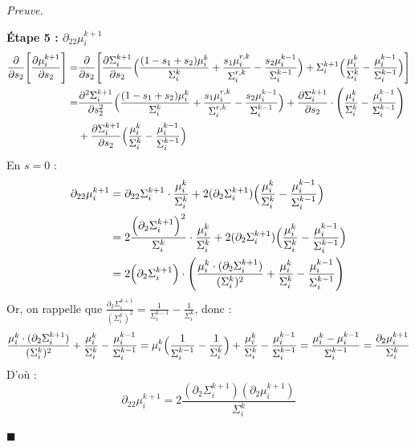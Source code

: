 \documentclass[12pt]{article}
\renewcommand{\qedsymbol}{$\blacksquare$}
\renewenvironment{proof}[1][\proofname]{%
  \par\medskip\noindent
  \textit{\color{proofgray}#1.}\enspace\ignorespaces
}{\hfill\qedsymbol\par\medskip}
\renewcommand{\proofname}{Preuve}
\begin{document}
\begin{proof}
\medskip
\textbf{Étape 5 : $\partial_{22}\mu_i^{k+1}$}
\begin{equation*}
\begin{aligned}
\frac{\partial}{\partial s_2}\Biggl[
    \frac{\partial \mu_i^{k+1}}{\partial s_2}
\Biggr] 
=& \frac{\partial}{\partial s_2}\Biggl[ 
\frac{\partial \Sigma_i^{k+1}}{\partial s_2} \Bigl( 
    \frac{(1-s_1+s_2)\mu_i^k}{\Sigma_i^{k}} + \frac{s_1\mu_i^{r,k}}{\Sigma_i^{r,k}} - \frac{s_2\mu_i^{k-1}}{\Sigma_i^{k-1}} \Bigr) 
    + \Sigma_i^{k+1} \Bigl( 
        \frac{\mu_i^{k}}{\Sigma_i^{k}} - \frac{\mu_i^{k-1}}{\Sigma_i^{k-1}}
    \Bigr)
\Biggr]\\
=& \frac{\partial^2 \Sigma_i^{k+1}}{\partial s_2^2 }  \Bigl( 
    \frac{(1-s_1+s_2)\mu_i^k}{\Sigma_i^{k}} + \frac{s_1\mu_i^{r,k}}{\Sigma_i^{r,k}} - \frac{s_2\mu_i^{k-1}}{\Sigma_i^{k-1}} \Bigr) 
    + \frac{\partial \Sigma_i^{k+1}}{\partial s_2} \cdot \Biggl(
        \frac{\mu_i^{k}}{\Sigma_i^{k}} - \frac{\mu_i^{k-1}}{\Sigma_i^{k-1}}
    \Biggr)\\
    &+ \frac{\partial \Sigma_i^{k+1}}{\partial s_2}  \Bigl( 
        \frac{\mu_i^{k}}{\Sigma_i^{k}} - \frac{\mu_i^{k-1}}{\Sigma_i^{k-1}}
    \Bigr)
\end{aligned}
\end{equation*}
En $s=0$ :
\begin{equation*}
    \begin{aligned}
\partial_{22} \mu_i^{k+1} &= \partial_{22} \Sigma_i^{k+1} \cdot \frac{\mu_i^k}{\Sigma_i^k} + 2(\partial_2 \Sigma_i^{k+1}) \Bigl(
    \frac{\mu_i^{k}}{\Sigma_i^{k}} -  \frac{\mu_i^{k-1}}{\Sigma_i^{k-1}}
\Bigr)\\
&=2 \frac{\Bigl(\partial_2 \Sigma_i^{k+1}\Bigr)^2}{\Sigma_i^k} \cdot \frac{\mu_i^k}{\Sigma_i^k} +  2(\partial_2 \Sigma_i^{k+1}) \Bigl(
    \frac{\mu_i^{k}}{\Sigma_i^{k}} -  \frac{\mu_i^{k-1}}{\Sigma_i^{k-1}}
    \Bigr)
    \\
    &=2\Bigl(\partial_2 \Sigma_i^{k+1}\Bigr)\cdot \Biggl(
    \frac{\mu_i^k \cdot (\partial_2 \Sigma_i^{k+1})}{(\Sigma_i^{k})^2} + \frac{\mu_i^{k}}{\Sigma_i^{k}} - \frac{\mu_i^{k-1}}{\Sigma_i^{k-1}}
    \Biggr)
    \end{aligned}
\end{equation*}
Or, on rappelle que $\frac{\partial_2 \Sigma_i^{k+1}}{(\Sigma_i^k)^2} =  \frac{1}{\Sigma_i^{k-1}} - \frac{1}{\Sigma_i^{k}}$, donc :
\begin{equation*}
\frac{\mu_i^k \cdot (\partial_2 \Sigma_i^{k+1})}{(\Sigma_i^{k})^2} + \frac{\mu_i^{k}}{\Sigma_i^{k}} - \frac{\mu_i^{k-1}}{\Sigma_i^{k-1}} = \mu_i^k\Bigl(\frac{1}{\Sigma_i^{k-1}} - \frac{1}{\Sigma_i^{k}}\Bigr) + \frac{\mu_i^{k}}{\Sigma_i^{k}} - \frac{\mu_i^{k-1}}{\Sigma_i^{k-1}} = \frac{\mu_i^{k} - \mu_i^{k-1}}{\Sigma_i^{k-1}} = \frac{\partial_2\mu_i^{k+1}}{\Sigma_i^k}
\end{equation*}
D'où :
\begin{equation*}
\partial_{22} \mu_i^{k+1} = 2 \frac{(\partial_2 \Sigma_i^{k+1})(\partial_2 \mu_i^{k+1})}{\Sigma_i^k}
\end{equation*}


\end{proof}
\end{document}

